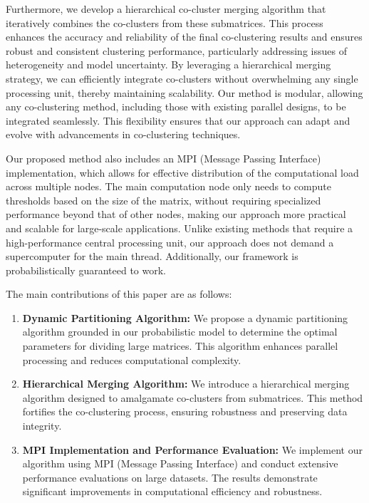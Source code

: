 \documentclass[journal]{IEEEtran}
\begin{document}
Furthermore, we develop a hierarchical co-cluster merging algorithm that iteratively combines the co-clusters from these submatrices. This process enhances the accuracy and reliability of the final co-clustering results and ensures robust and consistent clustering performance, particularly addressing issues of heterogeneity and model uncertainty. By leveraging a hierarchical merging strategy, we can efficiently integrate co-clusters without overwhelming any single processing unit, thereby maintaining scalability. Our method is modular, allowing any co-clustering method, including those with existing parallel designs, to be integrated seamlessly. This flexibility ensures that our approach can adapt and evolve with advancements in co-clustering techniques.

Our proposed method also includes an MPI (Message Passing Interface) implementation, which allows for effective distribution of the computational load across multiple nodes. The main computation node only needs to compute thresholds based on the size of the matrix, without requiring specialized performance beyond that of other nodes, making our approach more practical and scalable for large-scale applications. Unlike existing methods that require a high-performance central processing unit, our approach does not demand a supercomputer for the main thread. Additionally, our framework is probabilistically guaranteed to work. 

The main contributions of this paper are as follows:
\begin{enumerate}
  \item \textbf{Dynamic Partitioning Algorithm:}
        We propose a dynamic partitioning algorithm grounded in our probabilistic model to determine the optimal parameters for dividing large matrices. This algorithm enhances parallel processing and reduces computational complexity.

  \item \textbf{Hierarchical Merging Algorithm:}
        We introduce a hierarchical merging algorithm designed to amalgamate co-clusters from submatrices. This method fortifies the co-clustering process, ensuring robustness and preserving data integrity.

  \item \textbf{MPI Implementation and Performance Evaluation:}
        We implement our algorithm using MPI (Message Passing Interface) and conduct extensive performance evaluations on large datasets. The results demonstrate significant improvements in computational efficiency and robustness.

\end{enumerate}
\end{document}
